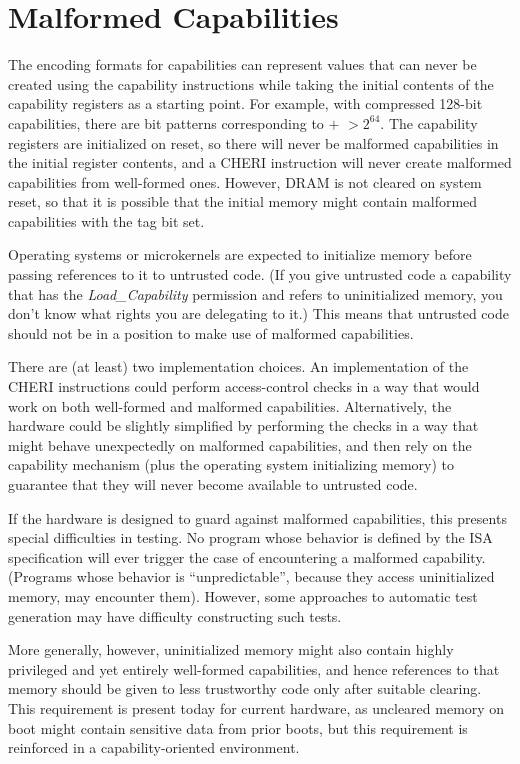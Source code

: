 \section{Malformed Capabilities}

The encoding formats for capabilities can represent values that can never be
created using the capability instructions while taking the initial contents of
the capability registers as a starting point. For example, with compressed
128-bit capabilities, there are bit patterns corresponding to \cbase{} $+$
\clength{} $> 2^{64}$.
The capability registers are initialized on reset, so there will
never be malformed capabilities in the initial register contents, and
a CHERI instruction will never create malformed capabilities from
well-formed ones. However, DRAM is not cleared on system reset, so that it is
possible that the initial memory might contain malformed capabilities with the
tag bit set.

Operating systems or microkernels are expected to initialize memory before
passing references to it to untrusted code. (If you give untrusted code a capability that
has the \emph{Load\_Capability} permission and refers to uninitialized memory,
you don't know what rights you are delegating to it.)
This means that untrusted
code should not be in a position to make use of malformed capabilities.

There are (at least) two implementation choices. An implementation of the CHERI
instructions could perform access-control checks in a way that would
work on both well-formed and malformed capabilities.
Alternatively, the hardware could be
slightly simplified by performing the checks in a way that might behave
unexpectedly on malformed capabilities, and then rely on the capability
mechanism (plus the operating system initializing memory) to guarantee that
they will never become available to untrusted code.

If the hardware is designed to guard against malformed capabilities, this
presents special difficulties in testing. No program whose behavior
is defined by the ISA specification will ever trigger the case of encountering
a malformed capability. (Programs whose behavior is ``unpredictable'', because
they access uninitialized memory, may encounter them).
However, some approaches to
automatic test generation may have difficulty constructing such tests.

More generally, however, uninitialized memory might also contain highly
privileged and yet entirely well-formed capabilities, and hence references to
that memory should be given to less trustworthy code only after suitable
clearing.
This requirement is present today for current hardware, as uncleared memory on
boot might contain sensitive data from prior boots, but this requirement is
reinforced in a capability-oriented environment.

